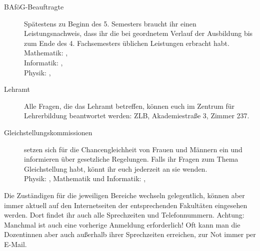 \begin{description}
    \item[BAföG-Beauftragte] Spätestens zu Beginn des 5. Semesters braucht ihr einen Leistungsnachweis, dass ihr die bei geordnetem Verlauf der Ausbildung bis zum Ende des 4. Fachsemesters üblichen Leistungen erbracht habt.\\
    Mathematik: \bafogmathe , \email{\bafogmatheemail} \\
    Informatik: \bafoginformatik , \email{\bafoginformatikemail}\\
    Physik: \bafogphysik , \email{\bafogphysikemail}

    \item[Lehramt] Alle Fragen, die das Lehramt betreffen, können euch im Zentrum für Lehrerbildung beantwortet werden: ZLB, Akademiestraße 3, Zimmer 237.

    \item[Gleichstellungskommissionen] setzen sich für die Chancengleichheit von Frauen und Männern ein und informieren über gesetzliche Regelungen. Falls ihr Fragen zum Thema Gleichstellung habt, könnt ihr euch jederzeit an sie wenden.\\
    Physik: \gleichstellungsbeauftragtephysik, \email{\gleichstellungsbeauftragtephysikemail}
    Mathematik und Informatik: \gleichstellungsbeauftragtemathe, \email{\gleichstellungsbeauftragtemathe}

\end{description}

\noindent Die Zuständigen für die jeweiligen Bereiche wechseln gelegentlich, können aber immer aktuell auf den Internetseiten der entsprechenden Fakultäten eingesehen werden. Dort findet ihr auch alle Sprechzeiten und Telefonnummern. Achtung: Manchmal ist auch eine vorherige Anmeldung erforderlich! Oft kann man die Dozentinnen aber auch außerhalb ihrer Sprechzeiten erreichen, zur Not immer per E-Mail.\\[.9cm]

\relax

